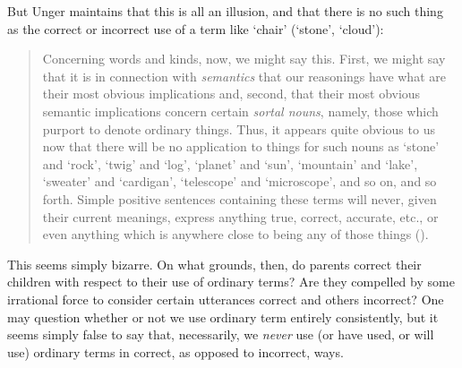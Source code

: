 \documentclass[11pt]{article}
\newenvironment{squote}{%
	\begin{quote}\begin{singlespace}%
	}{%
	\end{singlespace}\end{quote}}
\begin{document}
\begin{spacing}{1.5}
But Unger maintains that this is all an illusion, and that there is no
such thing as the correct or incorrect use of a term like `chair'
(`stone', `cloud'):

\begin{squote}
Concerning words and kinds, now, we might say this.  First, we might
say that it is in connection with \emph{semantics} that our reasonings have
what are their most obvious implications and, second, that their most
obvious semantic implications concern certain \emph{sortal nouns}, namely,
those which purport to denote ordinary things.  Thus, it appears quite
obvious to us now that there will be no application to things for such
nouns as `stone' and `rock', `twig' and `log', `planet' and `sun',
`mountain' and `lake', `sweater' and `cardigan', `telescope' and
`microscope', and so on, and so forth.  Simple positive sentences
containing these terms will never, given their current meanings,
express anything true, correct, accurate, etc., or even anything which
is anywhere close to being any of those things
(\citeyear[148]{unger1979}).
\end{squote}

This seems simply bizarre.  On what grounds, then, do parents correct
their children with respect to their use of ordinary terms?  Are they
compelled by some irrational force to consider certain utterances
correct and others incorrect?  One may question whether or not we use
ordinary term entirely consistently, but it seems simply false to say that,
necessarily, we {\em never} use (or have used, or will use) ordinary
terms in correct, as opposed to incorrect, ways.  

\begin{comment}
As we shall see,
color words are susceptible to the sorites paradox as well, but that
should not make us think that we cannot use `red' successfully:

\begin{squote}
It is\,\ldots\,unclear how far our use of e.g. the vocabulary of
colours \emph{is} consistent.  The descriptions given of awkward cases
may vary from occasion to occasion.  Besides that, the notion of using
a predicate consistently would appear to require some objective
criteria for variation in relevant respects among items to be
described in terms of it; but what is distinctive about observational
predicates is exactly the lack of such criteria.  So it would be
unwise to lean too heavily, as though it were a matter of hard fact,
upon the consistency of our employment of colour predicates.  What,
however, may be depended upon is that our use of these predicates is
largely \emph{successful}; the expectations which we form on the basis
of others' ascriptions of colour are not usually disappointed.
Agreement is generally possible about how colours are to be described;
and this, of course, is equivalent to saying that others \emph{seem}
to use colour predicates in a largely consistent way
\citep[361]{wright1975}.
\end{squote}


\end{comment}
\end{spacing}
\end{document}
